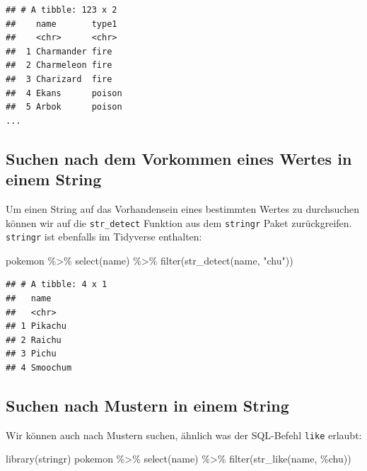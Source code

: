 \documentclass[
]{book}
\newenvironment{Shaded}{\begin{snugshade}}{\end{snugshade}}
\newcommand{\FunctionTok}[1]{\textcolor[rgb]{0.00,0.00,0.00}{#1}}
\newcommand{\NormalTok}[1]{#1}
\newcommand{\SpecialCharTok}[1]{\textcolor[rgb]{0.00,0.00,0.00}{#1}}
\newcommand{\StringTok}[1]{\textcolor[rgb]{0.31,0.60,0.02}{#1}}
\begin{document}
\begin{verbatim}
## # A tibble: 123 x 2
##    name       type1   
##    <chr>      <chr>   
##  1 Charmander fire    
##  2 Charmeleon fire    
##  3 Charizard  fire    
##  4 Ekans      poison  
##  5 Arbok      poison  
...
\end{verbatim}

\hypertarget{suchen-nach-dem-vorkommen-eines-wertes-in-einem-string}{%
\subsection{Suchen nach dem Vorkommen eines Wertes in einem String}\label{suchen-nach-dem-vorkommen-eines-wertes-in-einem-string}}

Um einen String auf das Vorhandensein eines bestimmten Wertes zu durchsuchen können wir auf die \texttt{str\_detect} Funktion aus dem \texttt{stringr} Paket zurückgreifen. \texttt{stringr} ist ebenfalls im Tidyverse enthalten:

\begin{Shaded}
\begin{Highlighting}[]
\NormalTok{pokemon }\SpecialCharTok{\%\textgreater{}\%}
  \FunctionTok{select}\NormalTok{(name) }\SpecialCharTok{\%\textgreater{}\%}
  \FunctionTok{filter}\NormalTok{(}\FunctionTok{str\_detect}\NormalTok{(name, }\StringTok{"chu"}\NormalTok{))}
\end{Highlighting}
\end{Shaded}

\begin{verbatim}
## # A tibble: 4 x 1
##   name    
##   <chr>   
## 1 Pikachu 
## 2 Raichu  
## 3 Pichu   
## 4 Smoochum
\end{verbatim}

\hypertarget{suchen-nach-mustern-in-einem-string}{%
\subsection{Suchen nach Mustern in einem String}\label{suchen-nach-mustern-in-einem-string}}

Wir können auch nach Mustern suchen, ähnlich was der SQL-Befehl \texttt{like} erlaubt:

\begin{Shaded}
\begin{Highlighting}[]
\FunctionTok{library}\NormalTok{(stringr)}
\NormalTok{pokemon }\SpecialCharTok{\%\textgreater{}\%}
  \FunctionTok{select}\NormalTok{(name) }\SpecialCharTok{\%\textgreater{}\%}
  \FunctionTok{filter}\NormalTok{(}\FunctionTok{str\_like}\NormalTok{(name, }\StringTok{\textquotesingle{}\%chu\textquotesingle{}}\NormalTok{))}
\end{Highlighting}
\end{Shaded}
\end{document}
